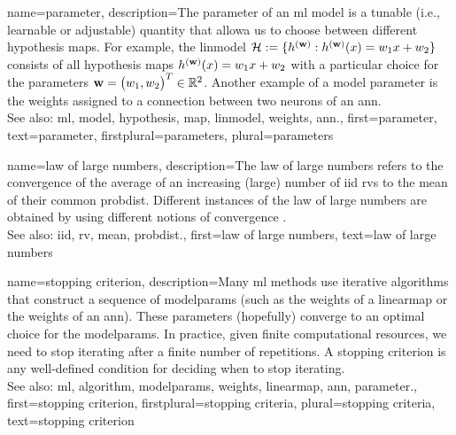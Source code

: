 {name={parameter},
	description={The parameter of an \gls{ml} \gls{model} is a tunable 
		(i.e., learnable or adjustable) quantity that allowa us to choose 
		between different \gls{hypothesis} \glspl{map}. For example, the \gls{linmodel} $\mathcal{H} := \{h^{({\bf w})}: h^{({\bf w})}(x)= w_{1} x + w_{2}\}$ 
		consists of all \gls{hypothesis} \glspl{map} $h^{({\bf w})}(x)= w_{1} x + w_{2}$ 
		with a particular choice for the parameters ${\bf w} = \big(w_{1},w_{2}\big)^{T} \in \mathbb{R}^{2}$. 
		Another example of a \gls{model} parameter is the \gls{weights} assigned to a connection between two neurons of an \gls{ann}.
				\\
		See also: \gls{ml}, \gls{model}, \gls{hypothesis}, \gls{map}, \gls{linmodel}, \gls{weights}, \gls{ann}.},
	first={parameter},
	text={parameter},
	firstplural={parameters}, 
 	plural={parameters}
}

{name={law of large numbers},
	description={The law of large numbers refers to the 
		convergence of the average of an increasing (large) number of \gls{iid} \glspl{rv} 
		to the \gls{mean} of their common \gls{probdist}. Different instances of the 
		law of large numbers are obtained by using different notions of convergence \cite{papoulis}.
				\\
		See also: \gls{iid}, \gls{rv}, \gls{mean}, \gls{probdist}.},
	first={law of large numbers},
	text={law of large numbers}
}
    
{name={stopping criterion},
	description={Many \gls{ml} methods use iterative \glspl{algorithm} that construct a 
		sequence of \gls{modelparams} (such as the \gls{weights} of a \gls{linearmap} or 
		the \gls{weights} of an \gls{ann}). These \glspl{parameter} (hopefully) converge to an optimal choice 
		for the \gls{modelparams}. In practice, given finite computational 
		resources, we need to stop iterating after a finite number of repetitions. 
		A stopping criterion is any well-defined condition for deciding when to stop  
		iterating.
				\\
		See also: \gls{ml}, \gls{algorithm}, \gls{modelparams}, \gls{weights}, \gls{linearmap}, \gls{ann}, \gls{parameter}.},
	first={stopping criterion},
	firstplural={stopping criteria},
	plural={stopping criteria}, 
	text={stopping criterion}
}

